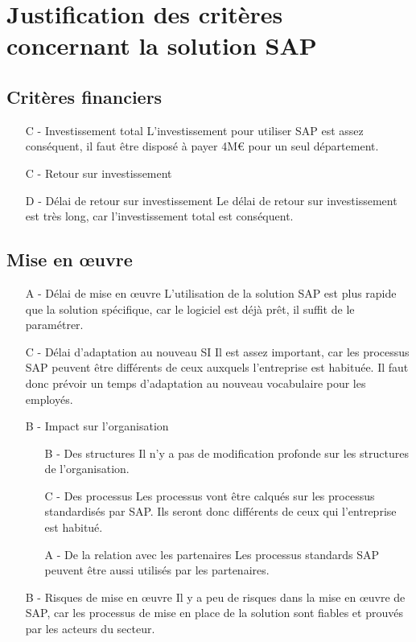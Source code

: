\section{Justification des critères concernant la solution SAP}

\subsection{Critères financiers}

\begin{itemize}
\item [C -] Investissement total\el
	L'investissement pour utiliser SAP est assez conséquent,
    il faut être disposé à payer 4M€ pour un seul département.
	
\item [C -] Retour sur investissement
		
\item [D -] Délai de retour sur investissement\el
	Le délai de retour sur investissement est très long,
    car l'investissement total est conséquent.
\end{itemize}

\subsection{Mise en \oe{}uvre}

\begin{itemize}
\item [A -] Délai de mise en \oe{}uvre\el
	L'utilisation de la solution SAP est plus rapide que la solution
    spécifique, car le logiciel est déjà prêt, il suffit de le paramétrer.

\item [C -] Délai d'adaptation au nouveau SI\el
	Il est assez important, car les processus SAP peuvent être
    différents de ceux auxquels l'entreprise est habituée. Il faut
    donc prévoir un temps d'adaptation au nouveau vocabulaire pour
    les employés.

\item [B -] Impact sur l'organisation
    \begin{itemize}
	\item[B -] Des structures\el
		Il n'y a pas de modification profonde sur les structures
        de l'organisation.
		
	\item[C -] Des processus\el
		Les processus vont être calqués sur les processus standardisés
        par SAP. Ils seront donc différents de ceux qui l'entreprise
        est habitué.

	\item[A -] De la relation avec les partenaires\el
		Les processus standards SAP peuvent être aussi utilisés par
        les partenaires.
    \end{itemize}

\item[B -] Risques de mise en \oe{}uvre\el
	Il y a peu de risques dans la mise en \oe{}uvre de SAP, car les processus
    de mise en place de la solution sont fiables et prouvés par les acteurs
    du secteur. 
\end{itemize}
	

